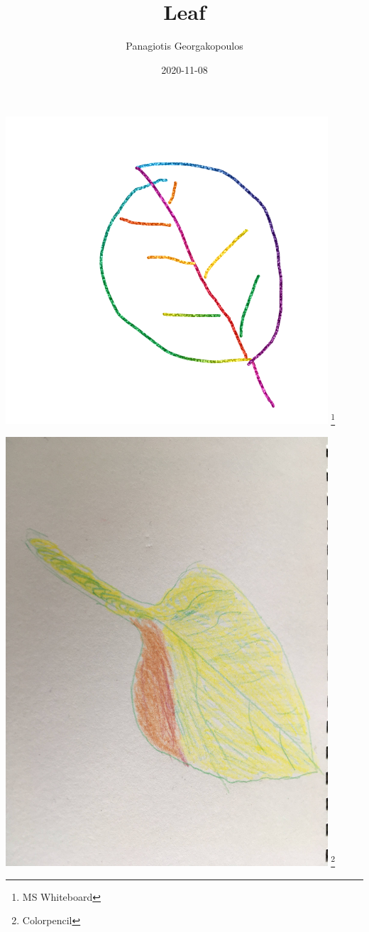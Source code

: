 \documentclass[12pt, a4paper]{article}
\title{Leaf}
\author{Panagiotis Georgakopoulos}
\date{2020-11-08}
\begin{document}
\begin{titlepage}
\maketitle
\thispagestyle{empty}
\end{titlepage}


\includegraphics[width=0.9\textwidth,height=\textheight,keepaspectratio]{leaf-ms-whiteboard.png}
\footnote{MS Whiteboard}
\newpage

\includegraphics[width=0.9\textwidth,height=\textheight,keepaspectratio]{leaf-colorpencil.jpg}
\footnote{Colorpencil}
\newpage
\end{document}
